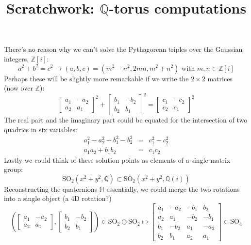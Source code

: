\documentclass[12pt]{article}
\title{Scratchwork: $\mathbb{Q}$-torus computations}
\date{}
\begin{document}

\sffamily

\maketitle

\noindent There's no reason why we can't solve the Pythagorean triples over the Gaussian integers, $\mathbb{Z}[i]$:
$$  a^2 + b^2 = c^2 \to (a,b,c) = (m^2 - n^2 , 2mn, m^2 + n^2) \text{ with }m,n \in \mathbb{Z}[i]$$
Perhaps these will be slightly more remarkable if we write the $2 \times 2$ matrices (now over $\mathbb{Z}$):
$$ \left[
\begin{array}{rr} 
a_1 & -a_2 \\ a_2 & a_1\end{array}
 \right]^2 + \left[
\begin{array}{rr} 
b_1 & -b_2 \\ b_2 & b_1\end{array}
 \right]^2 = \left[
\begin{array}{rr} 
c_1 & -c_2 \\ c_2 & c_1\end{array}
 \right]^2 $$
The real part and the imaginary part could be equated for the intersection of two quadrics in six variables:
\begin{eqnarray*}
a_1^2 - a_2^2 + b_1^2 - b_2^2 &=& c_1^2 - c_2^2 \\
a_1 a_2 + b_1 b_2  &=&  c_1 c_2
\end{eqnarray*}
Lastly we could think of these solution points as elements of a single matrix group:
$$ \text{SO}_2(x^2 + y^2, \mathbb{Q}) \subset \text{SO}_2(x^2 + y^2, \mathbb{Q}(i)) $$
Reconstructing the quaternions $\mathbb{H}$ essentially, we could merge the two rotations into a single object (a 4D rotation?)
$$ \left( 
\left[
\begin{array}{rr} 
a_1 & -a_2 \\ a_2 & a_1\end{array}
 \right] , \left[
\begin{array}{rr} 
b_1 & -b_2 \\ b_2 & b_1\end{array}
 \right] \right) \in \text{SO}_2 \oplus \text{SO}_2 \mapsto 
 \left[
 \begin{array}{rr|rr}
 a_1 & -a_2 & -b_1 & b_2 \\
 a_2 & a_1 & -b_2 & -b_1 \\ \hline
 b_1 & -b_2 & a_1 & -a_2 \\ 
 b_2 & b_1 & a_2 & a_1  \end{array}
  \right] \in \text{SO}_4
$$
\end{document}
